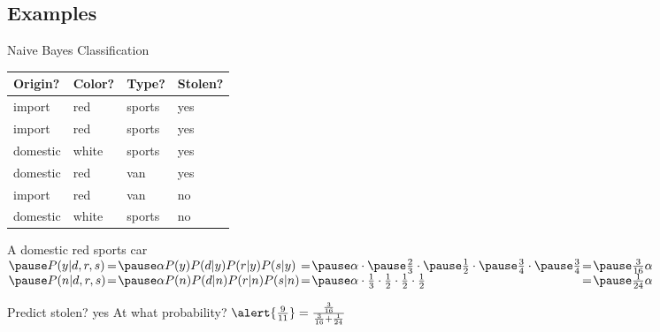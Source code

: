 \documentclass[12pt]{beamer}
\begin{document}
\subsection{Examples}
\begin{frame}{Naive Bayes Classification}
	\centering
	\begin{tabular}[t]{lll|l}
		Origin?  & Color? & Type?  & Stolen? \\
		\hline
		import   & red    & sports & yes \\
		import   & red    & sports & yes \\
		domestic & white  & sports & yes \\
		domestic & red    & van    & yes \\
		import   & red    & van    & no \\
		domestic & white  & sports & no \\
	\end{tabular}
	
	\pause
	\begin{block}{A domestic red sports car}
	\small
	$
	\begin{array}{@{}l@{\hspace{.1em}}l@{\hspace{.1em}}l@{\hspace{.1em}}l@{\hspace{.1em}}l@{\hspace{.1em}}l@{\hspace{.1em}}l@{}}
		\pause
		P(y|d,r,s) & = & \pause\alpha P(y)P(d|y)P(r|y)P(s|y) 
		           & = & \pause\alpha\cdot\pause\frac{2}{3}\cdot\pause\frac{1}{2}\cdot\pause\frac{3}{4}\cdot\pause\frac{3}{4}
		           & = & \pause\frac{3}{16}\alpha
		\\
		\pause
		P(n|d,r,s) & = & \pause\alpha P(n)P(d|n)P(r|n)P(s|n)
		           & = & \pause\alpha\cdot\frac{1}{3}\cdot\frac{1}{2}\cdot\frac{1}{2}\cdot\frac{1}{2}
		           & = & \pause\frac{1}{24}\alpha
	\end{array}
	$
	\normalsize
	\medskip
	
	\pause
	Predict stolen?
	\pause
	\alert{yes}
	\hfill
	\pause
	At what probability?
	\pause
	$\alert{\frac{9}{11}} = \frac{\frac{3}{16}}{\frac{3}{16} + \frac{1}{24}}$
	\end{block}
\end{frame}
\end{document}
